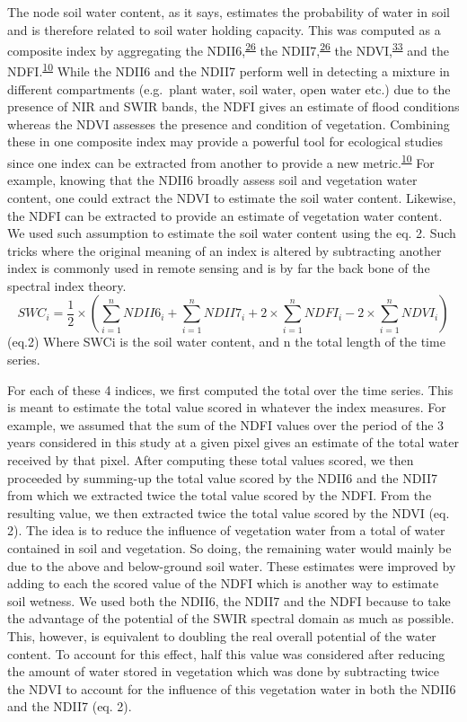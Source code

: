 \documentclass[12pt,oneside]{article}
\begin{document}
The node soil water content, as it says, estimates the probability of
water in soil and is therefore related to soil water holding capacity.
This was computed as a composite index by aggregating the
NDII6,\textsuperscript{\protect\hyperlink{ref-Hunt_and_Rock_1989}{26}}
the
NDII7,\textsuperscript{\protect\hyperlink{ref-Hunt_and_Rock_1989}{26}}
the NDVI,\textsuperscript{\protect\hyperlink{ref-Tucker_1979}{33}} and
the
NDFI.\textsuperscript{\protect\hyperlink{ref-Boschetti_et_al_2014}{10}}
While the NDII6 and the NDII7 perform well in detecting a mixture in
different compartments (e.g.~plant water, soil water, open water etc.)
due to the presence of NIR and SWIR bands, the NDFI gives an estimate of
flood conditions whereas the NDVI assesses the presence and condition of
vegetation. Combining these in one composite index may provide a
powerful tool for ecological studies since one index can be extracted
from another to provide a new
metric.\textsuperscript{\protect\hyperlink{ref-Boschetti_et_al_2014}{10}}
For example, knowing that the NDII6 broadly assess soil and vegetation
water content, one could extract the NDVI to estimate the soil water
content. Likewise, the NDFI can be extracted to provide an estimate of
vegetation water content. We used such assumption to estimate the soil
water content using the eq. 2. Such tricks where the original meaning of
an index is altered by subtracting another index is commonly used in
remote sensing and is by far the back bone of the spectral index theory.
\[SWC_i = \frac{1}{2}\times ( \sum_{i=1}^{n} NDII6_i + \sum_{i=1}^{n}NDII7_i + 2\times \sum_{i=1}^{n}NDFI_i - 2\times \sum_{i=1}^{n}NDVI_i )\]
(eq.2) Where SWCi is the soil water content, and n the total length of
the time series.

For each of these 4 indices, we first computed the total over the time
series. This is meant to estimate the total value scored in whatever the
index measures. For example, we assumed that the sum of the NDFI values
over the period of the 3 years considered in this study at a given pixel
gives an estimate of the total water received by that pixel. After
computing these total values scored, we then proceeded by summing-up the
total value scored by the NDII6 and the NDII7 from which we extracted
twice the total value scored by the NDFI. From the resulting value, we
then extracted twice the total value scored by the NDVI (eq. 2). The
idea is to reduce the influence of vegetation water from a total of
water contained in soil and vegetation. So doing, the remaining water
would mainly be due to the above and below-ground soil water. These
estimates were improved by adding to each the scored value of the NDFI
which is another way to estimate soil wetness. We used both the NDII6,
the NDII7 and the NDFI because to take the advantage of the potential of
the SWIR spectral domain as much as possible. This, however, is
equivalent to doubling the real overall potential of the water content.
To account for this effect, half this value was considered after
reducing the amount of water stored in vegetation which was done by
subtracting twice the NDVI to account for the influence of this
vegetation water in both the NDII6 and the NDII7 (eq. 2).
\end{document}
